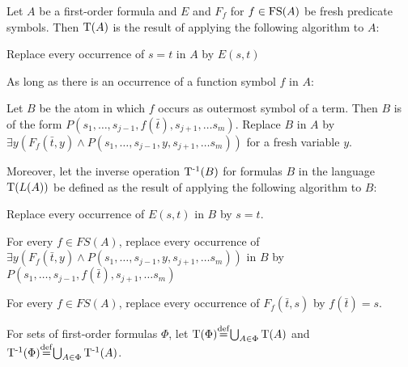 \begin{defi}
	\label{def:trans}
	Let $A$ be a first-order formula and $E$ and $F_f$ for $f \in \operatorname{FS}(A)$ be fresh predicate symbols.
	Then $\operatorname{T}(A)$ is the result of applying the following algorithm to $A$:

	\begin{compactenum}
	\item Replace every occurrence of $s=t$ in $A$ by $E(s, t)$
	\label{def:trans_step1}
	\item As long as there is an occurrence of a function symbol $f$ in $A$:
	\label{def:trans_step2}

		Let $B$ be the atom in which $f$ occurs as outermost symbol of a term.
		Then $B$ is of the form $P(s_1, \ldots, s_{j-1}, f(\bar t),\allowbreak s_{j+1}, \ldots s_m)$.
		Replace $B$ in $A$ by $\exists y (F_f(\bar t, y) \land P(s_1, \ldots, s_{j-1}, y, s_{j+1}, \ldots s_m))$ for a fresh variable $y$.
	\end{compactenum}
	\medskip

	Moreover, let the inverse operation $\operatorname{T^{-1}}(B)$ for formulas $B$ in the language $\operatorname{T}(L(A))$ be defined as the result of applying the following algorithm to $B$:
	\begin{compactenum}
	\item Replace every occurrence of $E(s, t)$ in $B$ by $s=t$.
	\item For every $f \in FS(A)$, replace every occurrence of 
		$\exists y (F_f(\bar t, y) \land P(s_1, \ldots, s_{j-1},\allowbreak y,\allowbreak s_{j+1}, \ldots s_m))$
		in $B$ by $P(s_1, \ldots, s_{j-1},\allowbreak f(\bar t),\allowbreak s_{j+1}, \ldots s_m)$ 
		\label{t_inverse_2}

	\item 
		\label{t_inverse_3}
		For every $f \in FS(A)$, replace every occurrence of 
		$F_f(\bar t, s)$ by $f(\bar t) = s$.
	\end{compactenum}

	For sets of first-order formulas $\Phi$, let $\Trans(\Phi) \defeq \bigcup_{A\in\Phi} \Trans(A)$ and 
$\TransInv(\Phi) \defeq \bigcup_{A\in\Phi} \TransInv(A)$.
\end{defi}

